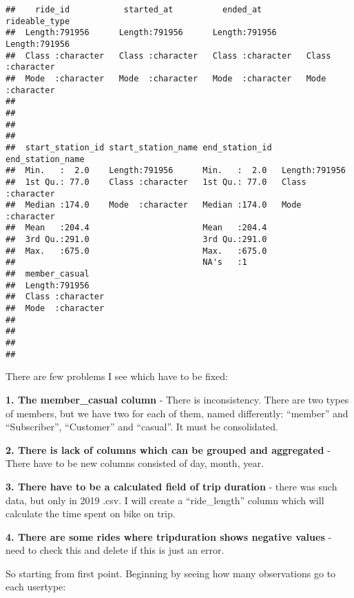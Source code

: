 \documentclass[
]{article}
\begin{document}
\begin{verbatim}
##    ride_id           started_at          ended_at         rideable_type     
##  Length:791956      Length:791956      Length:791956      Length:791956     
##  Class :character   Class :character   Class :character   Class :character  
##  Mode  :character   Mode  :character   Mode  :character   Mode  :character  
##                                                                             
##                                                                             
##                                                                             
##                                                                             
##  start_station_id start_station_name end_station_id  end_station_name  
##  Min.   :  2.0    Length:791956      Min.   :  2.0   Length:791956     
##  1st Qu.: 77.0    Class :character   1st Qu.: 77.0   Class :character  
##  Median :174.0    Mode  :character   Median :174.0   Mode  :character  
##  Mean   :204.4                       Mean   :204.4                     
##  3rd Qu.:291.0                       3rd Qu.:291.0                     
##  Max.   :675.0                       Max.   :675.0                     
##                                      NA's   :1                         
##  member_casual     
##  Length:791956     
##  Class :character  
##  Mode  :character  
##                    
##                    
##                    
## 
\end{verbatim}

There are few problems I see which have to be fixed:

\textbf{1. The member\_casual column} - There is inconsistency. There
are two types of members, but we have two for each of them, named
differently: ``member'' and ``Subscriber'', ``Customer'' and ``casual''.
It must be consolidated.

\textbf{2. There is lack of columns which can be grouped and aggregated}
- There have to be new columns consisted of day, month, year.

\textbf{3. There have to be a calculated field of trip duration} - there
was such data, but only in 2019 .csv. I will create a ``ride\_length''
column which will calculate the time spent on bike on trip.

\textbf{4. There are some rides where tripduration shows negative
values} - need to check this and delete if this is just an error.

So starting from first point. Beginning by seeing how many observations
go to each usertype:
\end{document}

